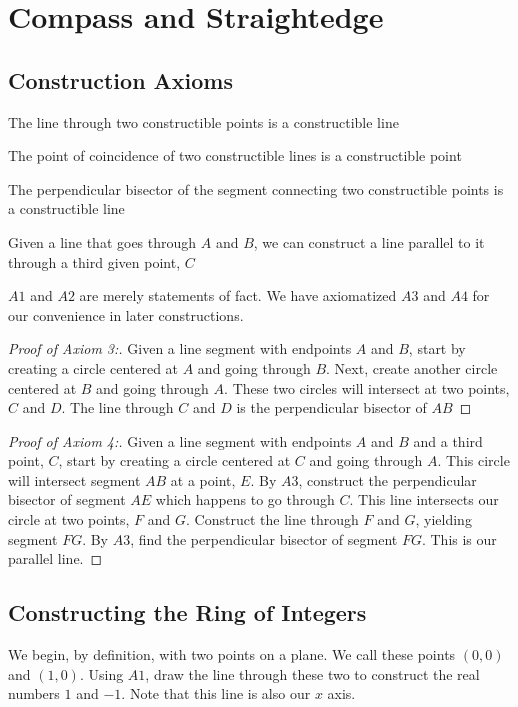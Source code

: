 \documentclass[]{article}
\begin{document}
\section{Compass and Straightedge}

\subsection{Construction Axioms} 
\begin{description}
\setlength\itemindent{.5pt}	\item[A1]
	The line through two constructible points is a constructible line
	\item[A2]
	The point of coincidence of two constructible lines is a constructible point
	\item[A3]
	The perpendicular bisector of the segment connecting two constructible points is a constructible line
	\item[A4]
	Given a line that goes through $A$ and $B$, we can construct a line parallel to it through a third given point, $C$
\end{description}

$A1$ and $A2$ are merely statements of fact. We have axiomatized $A3$ and $A4$ for our convenience in later constructions.

\begin{proof}[Proof of Axiom 3:]
	Given a line segment with endpoints $A$ and $B$, start by creating a circle centered at $A$ and going through $B$. Next, create another circle centered at $B$ and going through $A$. These two circles will intersect at two points, $C$ and $D$. The line through $C$ and $D$ is the perpendicular bisector of $AB$
\end{proof}
\begin{proof}[Proof of Axiom 4:]
	Given a line segment with endpoints $A$ and $B$ and a third point, $C$, start by creating a circle centered at $C$ and going through $A$. This circle will intersect segment $AB$ at a point, $E$. By $A3$, construct the perpendicular bisector of segment $AE$ which happens to go through $C$. This line intersects our circle at two points, $F$ and $G$. Construct the line through $F$ and $G$, yielding segment $FG$. By $A3$, find the perpendicular bisector of segment $FG$. This is our parallel line.
\end{proof}

\subsection{Constructing the Ring of Integers}
We begin, by definition, with two points on a plane. We call these points $(0,0)$ and $(1,0)$. Using $A1$, draw the line through these two to construct the real numbers $1$ and $-1$. Note that this line is also our $x$ axis.
\end{document}
